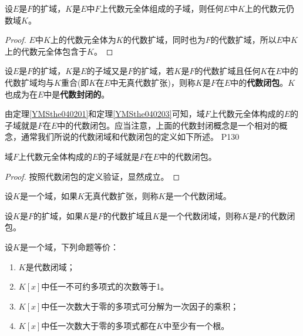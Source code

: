 \begin{corollary}
	设$E$是$F$的扩域，$K$是$E$中$F$上代数元全体组成的子域，则任何$E$中$K$上的代数元仍数域$K$。
\end{corollary}

\begin{proof}
	$E$中$K$上的代数元全体为$K$的代数扩域，同时也为$F$的代数扩域，所以$E$中$K$上的代数元全体包含于$K$。
\end{proof}

\begin{definition}\label{YMSdef040201}
	设$E$是$F$的扩域，$K$是$E$的子域又是$F$的扩域，若$K$是$F$的代数扩域且任何$K$在$E$中的代数扩域均与$K$重合(即$K$在$E$中无真代数扩张)，则称$K$是$F$在$E$中的\textbf{代数闭包}。$K$也成为在$E$中是\textbf{代数封闭的}。
\end{definition}

\original
{
	由定理\ref{YMSthe040201}和定理\ref{YMSthe040203}可知，域$F$上代数元全体构成的$E$的子域就是$F$在$E$中的代数闭包。应当注意，上面的代数封闭概念是一个相对的概念，通常我们所说的代数闭域和代数闭包的定义如下所述。
}
{P130}

\begin{proposition}
	域$F$上代数元全体构成的$E$的子域就是$F$在$E$中的代数闭包。
\end{proposition}

\begin{proof}
	按照代数闭包的定义验证，显然成立。
\end{proof}

\begin{definition}\label{YMSdef040202}
	设$K$是一个域，如果$K$无真代数扩张，则称$K$是一个代数闭域。
\end{definition}

\begin{definition}\label{YMSdef040203}
	设$K$是$F$的扩域，如果$K$是$F$的代数扩域且$K$是一个代数闭域，则称$K$是$F$的代数闭包。
\end{definition}

\begin{theorem}
	设$K$是一个域，下列命题等价：
	\begin{enumerate}
		\item $K$是代数闭域；
		\item $K[x]$中任一不可约多项式的次数等于1。
		\item $K[x]$中任一次数大于零的多项式可分解为一次因子的乘积；
		\item $K[x]$中任一次数大于零的多项式都在$K$中至少有一个根。
	\end{enumerate}
\end{theorem}

